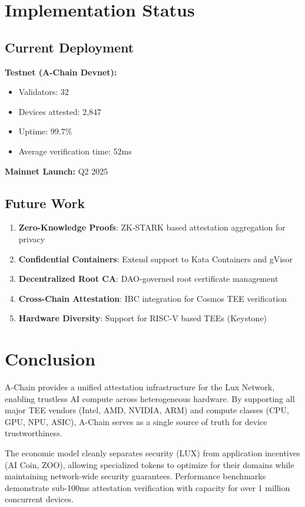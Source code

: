 \documentclass[11pt,a4paper]{article}
\begin{document}
\section{Implementation Status}

\subsection{Current Deployment}

\textbf{Testnet (A-Chain Devnet):}
\begin{itemize}
\item Validators: 32
\item Devices attested: 2,847
\item Uptime: 99.7\%
\item Average verification time: 52ms
\end{itemize}

\textbf{Mainnet Launch:} Q2 2025

\subsection{Future Work}

\begin{enumerate}
\item \textbf{Zero-Knowledge Proofs}: ZK-STARK based attestation aggregation for privacy
\item \textbf{Confidential Containers}: Extend support to Kata Containers and gVisor
\item \textbf{Decentralized Root CA}: DAO-governed root certificate management
\item \textbf{Cross-Chain Attestation}: IBC integration for Cosmos TEE verification
\item \textbf{Hardware Diversity}: Support for RISC-V based TEEs (Keystone)
\end{enumerate}

\section{Conclusion}

A-Chain provides a unified attestation infrastructure for the Lux Network, enabling trustless AI compute across heterogeneous hardware. By supporting all major TEE vendors (Intel, AMD, NVIDIA, ARM) and compute classes (CPU, GPU, NPU, ASIC), A-Chain serves as a single source of truth for device trustworthiness.

The economic model cleanly separates security (LUX) from application incentives (AI Coin, ZOO), allowing specialized tokens to optimize for their domains while maintaining network-wide security guarantees. Performance benchmarks demonstrate sub-100ms attestation verification with capacity for over 1 million concurrent devices.
\end{document}
